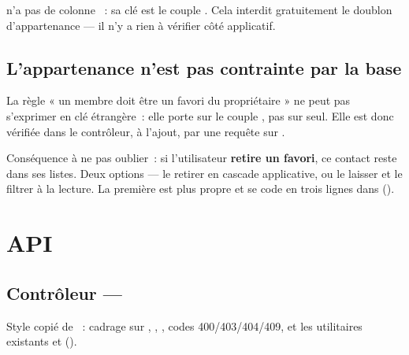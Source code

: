 \begin{note}
 n'a pas de colonne ~: sa clé est le couple
. Cela interdit gratuitement le doublon d'appartenance --- il n'y
a rien à vérifier côté applicatif.
\end{note}

\section{L'appartenance n'est pas contrainte par la base}

La règle « un membre doit être un favori du propriétaire » ne peut pas s'exprimer en clé
étrangère~: elle porte sur le couple , pas sur
 seul. Elle est donc vérifiée dans le contrôleur, à l'ajout, par une
requête sur .

Conséquence à ne pas oublier~: si l'utilisateur \textbf{retire un favori}, ce contact reste
dans ses listes. Deux options --- le retirer en cascade applicative, ou le laisser et le
filtrer à la lecture. La première est plus propre et se code en trois lignes dans
().

\chapter{API}

\section{Contrôleur --- }

Style copié de ~: cadrage sur ,
, , codes 400/403/404/409, et les
utilitaires existants  et 
().

